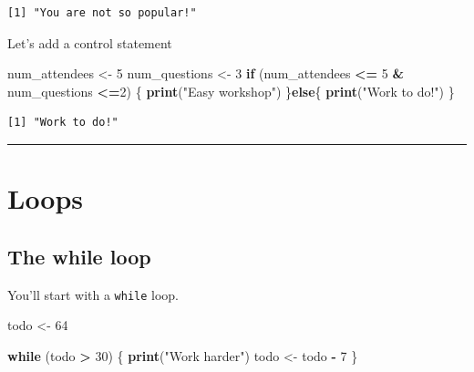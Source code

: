 \documentclass[
]{book}
\newenvironment{Shaded}{\begin{snugshade}}{\end{snugshade}}
\newcommand{\ControlFlowTok}[1]{\textcolor[rgb]{0.13,0.29,0.53}{\textbf{#1}}}
\newcommand{\DecValTok}[1]{\textcolor[rgb]{0.00,0.00,0.81}{#1}}
\newcommand{\KeywordTok}[1]{\textcolor[rgb]{0.13,0.29,0.53}{\textbf{#1}}}
\newcommand{\NormalTok}[1]{#1}
\newcommand{\OperatorTok}[1]{\textcolor[rgb]{0.81,0.36,0.00}{\textbf{#1}}}
\newcommand{\StringTok}[1]{\textcolor[rgb]{0.31,0.60,0.02}{#1}}
\begin{document}
\begin{verbatim}
[1] "You are not so popular!"
\end{verbatim}

Let's add a control statement

\begin{Shaded}
\begin{Highlighting}[]
\NormalTok{num_attendees <-}\StringTok{ }\DecValTok{5}
\NormalTok{num_questions <-}\StringTok{ }\DecValTok{3}
\ControlFlowTok{if}\NormalTok{ (num_attendees }\OperatorTok{<=}\StringTok{ }\DecValTok{5} \OperatorTok{&}\StringTok{ }\NormalTok{num_questions }\OperatorTok{<=}\DecValTok{2}\NormalTok{) \{}
  \KeywordTok{print}\NormalTok{(}\StringTok{"Easy workshop"}\NormalTok{)}
\NormalTok{\}}\ControlFlowTok{else}\NormalTok{\{}
  \KeywordTok{print}\NormalTok{(}\StringTok{"Work to do!"}\NormalTok{)}
\NormalTok{\}}
\end{Highlighting}
\end{Shaded}

\begin{verbatim}
[1] "Work to do!"
\end{verbatim}

\begin{center}\rule{0.5\linewidth}{0.5pt}\end{center}

\hypertarget{loops}{%
\section{Loops}\label{loops}}

\hypertarget{the-while-loop}{%
\subsection{The while loop}\label{the-while-loop}}

You'll start with a \texttt{while} loop.

\begin{Shaded}
\begin{Highlighting}[]
\NormalTok{todo <-}\StringTok{ }\DecValTok{64}

\ControlFlowTok{while}\NormalTok{ (todo }\OperatorTok{>}\StringTok{ }\DecValTok{30}\NormalTok{) \{}
  \KeywordTok{print}\NormalTok{(}\StringTok{"Work harder"}\NormalTok{)}
\NormalTok{  todo <-}\StringTok{ }\NormalTok{todo }\OperatorTok{-}\StringTok{ }\DecValTok{7}
\NormalTok{\}}
\end{Highlighting}
\end{Shaded}
\end{document}
